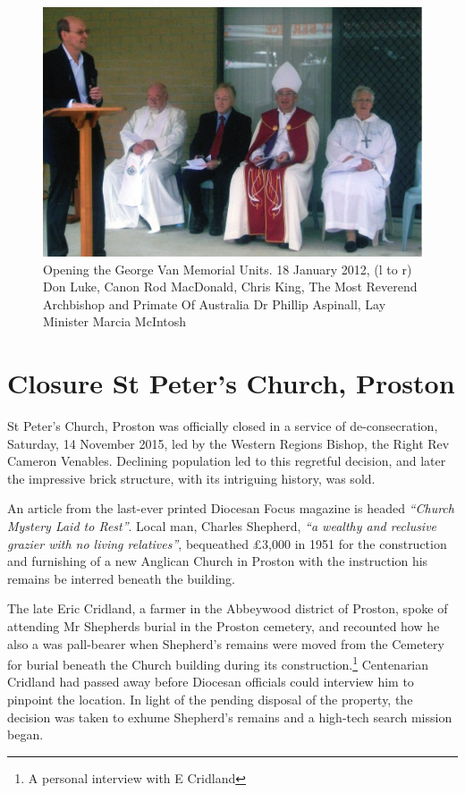 \begin{figure}[!htb]
\begin{center}
\includegraphics[width=1.\textwidth,center]{../images/openingGeorgeVannMemorialUnits.jpg}
\caption{Opening the George Van Memorial Units. 18 January 2012, (l to r) Don Luke, Canon Rod MacDonald, Chris King, The Most Reverend Archbishop and Primate Of Australia Dr Phillip Aspinall, Lay Minister Marcia McIntosh}
\end{center}
\end{figure}




\section{Closure St Peter's Church, Proston}



St Peter's Church, Proston was officially closed in a service of de-consecration, Saturday, 14 November 2015, led by the Western Regions Bishop, the Right Rev Cameron Venables. Declining population led to this regretful decision, and later the impressive brick structure, with its intriguing history, was sold.



An article from the last-ever printed Diocesan Focus magazine is headed \emph{``Church Mystery Laid to Rest''}. Local man, Charles Shepherd, \emph{``a wealthy and reclusive grazier with no living relatives''}, bequeathed \pounds3,000 in 1951 for the construction and furnishing of a new Anglican Church in Proston with the instruction his remains be interred beneath the building.



The late Eric Cridland, a farmer in the Abbeywood district of Proston, spoke of attending Mr Shepherds burial in the Proston cemetery, and recounted how he also a was pall-bearer when Shepherd's remains were moved from the Cemetery for burial beneath the Church building during its construction.\footnote{A personal interview with E Cridland} Centenarian Cridland had passed away before Diocesan officials could interview him to pinpoint the location. In light of the pending disposal of the property, the decision was taken to exhume Shepherd's remains and a high-tech search mission began.


